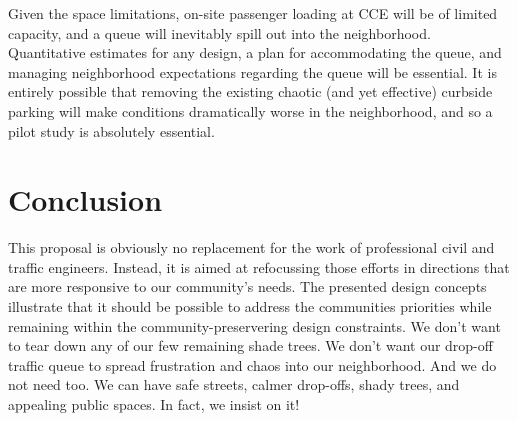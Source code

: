 \documentclass[12pt]{article}
\begin{document}
Given the space limitations, on-site passenger loading at CCE will be of
limited capacity, and a queue will inevitably spill out into the
neighborhood.  Quantitative estimates for any design, a plan for
accommodating the queue, and managing neighborhood expectations
regarding the queue will be essential.  It is entirely possible that
removing the existing chaotic (and yet effective) curbside parking
will make conditions dramatically worse in the neighborhood, and so a
pilot study is absolutely essential.

\section{Conclusion}

This proposal is obviously no replacement for the work of professional
civil and traffic engineers.  Instead, it is aimed at refocussing
those efforts in directions that are more responsive to our
community's needs.  The presented design concepts illustrate that it
should be possible to address the communities priorities while
remaining within the community-preservering design constraints.  We
don't want to tear down any of our few remaining shade trees.  We don't want
our drop-off traffic queue to spread frustration and chaos into our
neighborhood.  And we do not need too.  We can have safe streets,
calmer drop-offs, shady trees, and appealing public spaces.  In fact,
we insist on it!
\end{document}
